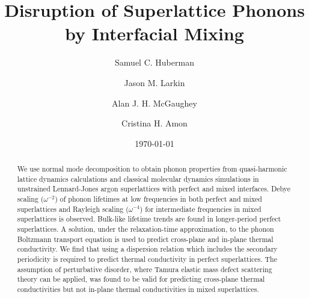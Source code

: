 \documentclass[aps,prb,preprint,preprintnumbers,amsmath,amssymb,floatfix,superscriptaddress]{revtex4}
\begin{document}
\title{Disruption of Superlattice Phonons by Interfacial Mixing}
\author{Samuel C. Huberman}
\author{Jason M. Larkin}
\author{Alan J. H. McGaughey}
\author{Cristina H. Amon}

\date{\today}%
\vspace{14mm}
  
\begin{abstract}

We use normal mode decomposition to obtain phonon properties from quasi-harmonic lattice dynamics calculations and classical molecular dynamics simulations in unstrained Lennard-Jones argon superlattices with perfect and mixed interfaces. Debye scaling ($\omega^{-2}$) of phonon lifetimes at low frequencies in both perfect and mixed superlattices and Rayleigh scaling ($\omega^{-4}$) for intermediate frequencies in mixed superlattices is observed. Bulk-like lifetime trends are found in longer-period perfect superlattices. A solution, under the relaxation-time approximation, to the phonon Boltzmann transport equation is used to predict cross-plane and in-plane thermal conductivity. We find that using a dispersion relation which includes the secondary periodicity is required to predict thermal conductivity in perfect superlattices. The assumption of perturbative disorder, where Tamura elastic mass defect scattering theory can be applied, was found to be valid for predicting cross-plane thermal conductivities but not in-plane thermal conductivities in mixed superlattices. 

\end{abstract}
\maketitle
\end{document}
